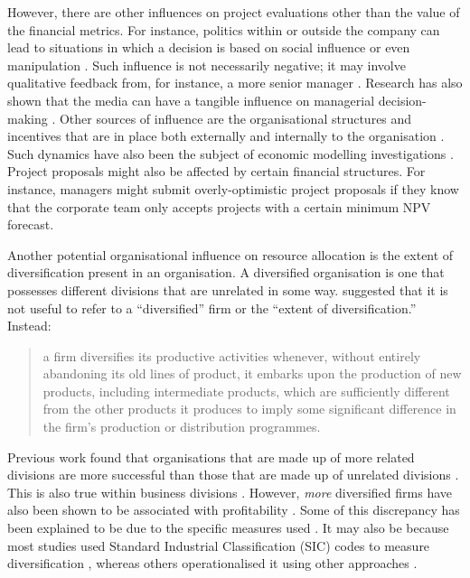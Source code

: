 \documentclass[a4paper, nobind, dvipsnames]{templates/ociamthesis}
\theoremstyle{definition}
\theoremstyle{definition}
\theoremstyle{definition}
\theoremstyle{definition}
\theoremstyle{remark}
\begin{document}
However, there are other influences on project evaluations other than the value
of the financial metrics. For instance, politics within or outside the company
can lead to situations in which a decision is based on social influence or even
manipulation \autocite{garbuio2017}. Such influence is not necessarily negative; it may
involve qualitative feedback from, for instance, a more senior manager
\autocite{thamhain2014}. Research has also shown that the media can have a tangible
influence on managerial decision-making \autocite{bednar2013,liu2013}. Other sources
of influence are the organisational structures and incentives that are in place
both externally \autocite{kokkinis2019} and internally to the organisation
\autocite{ullrich2004}. Such dynamics have also been the subject of economic modelling
investigations \autocite{reichelstein1997,cavagnac2005,ortner2017}. Project
proposals might also be affected by certain financial structures. For instance,
managers might submit overly-optimistic project proposals if they know that the
corporate team only accepts projects with a certain minimum NPV forecast.

Another potential organisational influence on resource allocation is the extent
of diversification present in an organisation. A diversified organisation is one
that possesses different divisions that are unrelated in some way. \textcite[p.~96]{penrose2009} suggested that it is not useful to refer to a ``diversified'' firm or the
``extent of diversification.'' Instead:

\begin{quote}
a firm diversifies its productive activities whenever, without entirely
abandoning its old lines of product, it embarks upon the production of new
products, including intermediate products, which are sufficiently different
from the other products it produces to imply some significant difference in
the firm's production or distribution programmes.
\end{quote}

Previous work found that organisations that are made up of more related
divisions are more successful than those that are made up of unrelated divisions
\autocite{harrison1993,rumelt1974,shelton1988,wernerfelt1988}. This is also true
within business divisions \autocite{davis1992}. However, \emph{more} diversified firms have
also been shown to be associated with profitability \autocite{grant1988}. Some of this
discrepancy has been explained to be due to the specific measures used
\autocite{lubatkin1986}. It may also be because most studies used Standard Industrial
Classification (SIC) codes to measure diversification \autocite[e.g.,][]{rumelt1974},
whereas others operationalised it using other approaches \autocite[e.g., resource-based;][]{harrison1993}.
\end{document}

